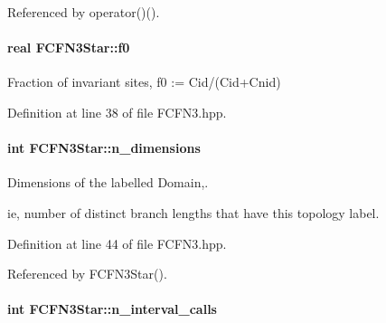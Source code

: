 \-Referenced by operator()().

\hypertarget{classFCFN3Star_a3afd13820d74fa145d6beafe2855e333}{
\paragraph[{f0}]{\setlength{\rightskip}{0pt plus 5cm}real {\bf \-F\-C\-F\-N3\-Star\-::f0}}}\label{classFCFN3Star_a3afd13820d74fa145d6beafe2855e333}


\-Fraction of invariant sites, f0 \-:= \-Cid/(\-Cid+\-Cnid) 



\-Definition at line 38 of file \-F\-C\-F\-N3.\-hpp.

\hypertarget{classFCFN3Star_a47a41d53ca005cab246ef1954e8e34e0}{
\paragraph[{n\-\_\-dimensions}]{\setlength{\rightskip}{0pt plus 5cm}int {\bf \-F\-C\-F\-N3\-Star\-::n\-\_\-dimensions}}}\label{classFCFN3Star_a47a41d53ca005cab246ef1954e8e34e0}


\-Dimensions of the labelled \-Domain,. 

ie, number of distinct branch lengths that have this topology label. 

\-Definition at line 44 of file \-F\-C\-F\-N3.\-hpp.



\-Referenced by \-F\-C\-F\-N3\-Star().

\hypertarget{classFCFN3Star_acdf33272ab3d95cd51709cd39a846ddd}{
\paragraph[{n\-\_\-interval\-\_\-calls}]{\setlength{\rightskip}{0pt plus 5cm}int {\bf \-F\-C\-F\-N3\-Star\-::n\-\_\-interval\-\_\-calls}}}\label{classFCFN3Star_acdf33272ab3d95cd51709cd39a846ddd}


